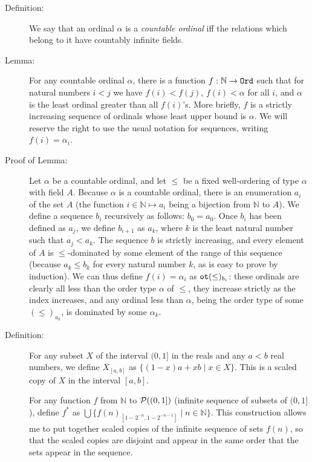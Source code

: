 \documentclass[12pt]{book}
\begin{document}
\begin{description}

\item[Definition:] We say that an ordinal $\alpha$ is a {\em countable
ordinal\/} iff the relations which belong to it have countably
infinite fields.  

\item[Lemma:] For any countable ordinal $\alpha$, there is a function
$f:{\mathbb N}\rightarrow {\tt Ord}$ such that for natural numbers
$i<j$ we have $f(i) < f(j)$, $f(i) < \alpha$ for all $i$, and $\alpha$
is the least ordinal greater than all $f(i)$'s.  More briefly, $f$ is
a strictly increasing sequence of ordinals whose least upper bound is
$\alpha$.  We will reserve the right to use the usual notation for
sequences, writing $f(i) = \alpha_i$.

\item[Proof of Lemma:] Let $\alpha$ be a countable ordinal, and let
$\leq$ be a fixed well-ordering of type $\alpha$ with field $A$.
Because $\alpha$ is a countable ordinal, there is an enumeration $a_i$
of the set $A$ (the function $i \in {\mathbb N} \mapsto a_i$ being a
bijection from ${\mathbb N}$ to $A$).  We define a sequence $b_i$
recursively as follows: $b_0 = a_0$.  Once $b_i$ has been defined as
$a_j$, we define $b_{i+1}$ as $a_k$, where $k$ is the least natural
number such that $a_j < a_k$.  The sequence $b$ is strictly
increasing, and every element of $A$ is $\leq$-dominated by some
element of the range of this sequence (because $a_k \leq b_k$ for
every natural number $k$, as is easy to prove by induction).  We can
thus define $f(i) = \alpha_i$ as ${\tt ot}(\leq)_{b_i}$: these
ordinals are clearly all less than the order type $\alpha$ of $\leq$,
they increase strictly as the index increases, and any ordinal less
than $\alpha$, being the order type of some $(\leq)_{a_k}$, is
dominated by some $\alpha_k$.

\item[Definition:] For any subset $X$ of the interval $(0,1]$
in the reals and any $a<b$ real numbers, we define $X_{[a,b]}$ as
$\{(1-x)a + xb \mid x \in X\}$.  This is a scaled copy of $X$ in the
interval $[a,b]$.

For any function $f$ from ${\mathbb N}$ to ${\cal P}((0,1])$ (infinite
sequence of subsets of $(0,1]$), define $f^*$ as $\bigcup
\{f(n)_{[1-2^{-n},1-2^{-n-1}]}\mid n \in {\mathbb N}\}$.  This
construction allows me to put together scaled copies of the infinite
sequence of sets $f(n)$, so that the scaled copies are disjoint and
appear in the same order that the sets appear in the sequence.


\end{description}
\end{document}
